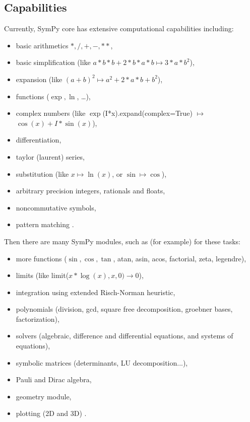 \documentclass[12pt]{article}
\begin{document}
\subsection{Capabilities}

Currently, SymPy core has extensive computational capabilities including:

\begin{itemize}
\item
    basic arithmetics $*,/,+,-,**$,
\item
    basic simplification (like $a*b*b + 2*b*a*b \mapsto 3*a*b^2$),
\item
    expansion (like $(a+b)^2 \mapsto a^2 + 2*a*b + b^2$),
\item
    functions ($\exp, \ln$, \dots),
\item
    complex numbers (like $\exp$(I*x).expand(complex=True) $\mapsto$
    $\cos(x)+I*\sin(x)$),
\item
    differentiation,
\item
    taylor (laurent) series,
\item
    substitution (like $x \mapsto \ln(x)$, or $\sin \mapsto \cos$),
\item
    arbitrary precision integers, rationals and floats,
\item
    noncommutative symbols,
\item
    pattern matching .
\end{itemize}
Then there are many SymPy modules, such as (for example) for these tasks:
\begin{itemize}
\item
    more functions ($\sin, \cos, \tan$, atan, asin, acos, factorial, zeta, legendre),
\item
    limits (like limit($x*\log(x), x, 0) \to 0$),
\item
    integration using extended Risch-Norman heuristic,
\item
    polynomials (division, gcd, square free decomposition, groebner bases, factorization),
\item
    solvers (algebraic, difference and differential equations, and systems of equations),
\item
    symbolic matrices (determinants, LU decomposition...),
\item
  Pauli and Dirac algebra,
\item
    geometry module,
\item
    plotting (2D and 3D) .
\end{itemize}
\end{document}
